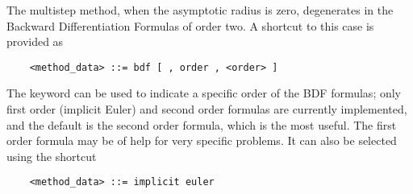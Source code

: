 \noindent
The multistep method, when the asymptotic radius is zero, degenerates
in the Backward Differentiation Formulas of order two.
A shortcut to this case is provided as
\begin{verbatim}
    <method_data> ::= bdf [ , order , <order> ]
\end{verbatim}
The keyword  can be used to indicate a specific order
of the BDF formulas; only first order (implicit Euler) and 
second order formulas are currently implemented, and the default
is the second order formula, which is the most useful.
The first order formula may be of help for very specific problems.
It can also be selected using the shortcut
\begin{verbatim}
    <method_data> ::= implicit euler
\end{verbatim}

